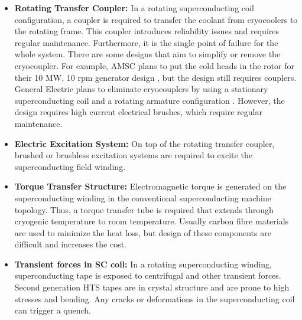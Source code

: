 \documentclass[12pt]{IET02}
\begin{document}
\begin{itemize}

  \item \textbf{Rotating Transfer Coupler:} In a rotating superconducting coil configuration, a coupler is required to transfer the coolant from cryocoolers to the rotating frame. This coupler introduces reliability issues and requires regular maintenance. Furthermore, it is the single point of failure for the whole system. There are some designs that aim to simplify or remove the cryocoupler. For example, AMSC plans to put the cold heads in the rotor for their 10 MW, 10 rpm generator design \cite{amsc_presentation}, but the design still requires couplers. General Electric plans to eliminate cryocouplers by using a stationary superconducting coil and a rotating armature configuration \cite{Stautner2012}. However, the design requires high current electrical brushes, which require regular maintenance.

  \item \textbf{Electric Excitation System:} On top of the rotating transfer coupler, brushed or brushless excitation systems are required to excite the superconducting field winding.

  \item \textbf{Torque Transfer Structure:} Electromagnetic torque is generated on the superconducting winding in the conventional superconducting machine topology. Thus, a torque transfer tube is required that extends through cryogenic temperature to room temperature. Usually carbon fibre materials are used to minimize the heat loss, but design of these components are difficult and increases the cost.

  \item \textbf{Transient forces in SC coil:} In a rotating superconducting winding, superconducting tape is exposed to centrifugal and other transient forces. Second generation HTS tapes are in crystal structure and are prone to high stresses and bending. Any cracks or deformations in the superconducting coil can trigger a quench.
\end{itemize}

\vspace{0.5pc}
\end{document}
